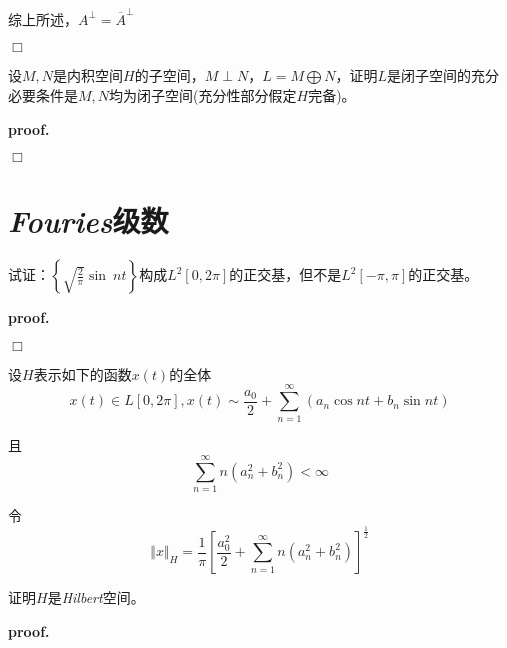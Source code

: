综上所述，$A^\perp=\overline{A}^\perp$

$\Box$

\begin{mdframed}
    \begin{question}
        设$M,N$是内积空间$H$的子空间，$M\perp N$，$L=M\bigoplus N$，证明$L$是闭子空间的充分必要条件是$M,N$均为闭子空间(充分性部分假定$H$完备)。
    \end{question}
\end{mdframed}

\textbf{proof.}

$\Box$

\section{\textsl{Fouries}级数}

\begin{mdframed}
    \begin{question}
        试证：$\left\{\sqrt{\frac{2}{\pi}}\sin\ nt\right\}$构成$L^2[0,2\pi]$的正交基，但不是$L^2[-\pi,\pi]$的正交基。
    \end{question}
\end{mdframed}

\textbf{proof.}

$\Box$

\begin{mdframed}
    \begin{question}
        设$H$表示如下的函数$x(t)$的全体
        \begin{equation}
            x(t)\in L[0,2\pi],x(t)\sim \frac{a_0}{2}+\sum_{n=1}^{\infty}(a_n\cos nt+b_n\sin nt)
        \end{equation}

        且
        \begin{equation}
            \sum_{n=1}^{\infty}n(a^2_n+b^2_n)<\infty
        \end{equation}

        令
        \begin{equation}
            \Vert x\Vert_H=\frac{1}{\pi}\left[\frac{a_0^2}{2}+\sum_{n=1}^{\infty}n(a^2_n+b^2_n)\right]^\frac{1}{2}
        \end{equation}

        证明$H$是\textsl{Hilbert}空间。
    \end{question}
\end{mdframed}

\textbf{proof.}

